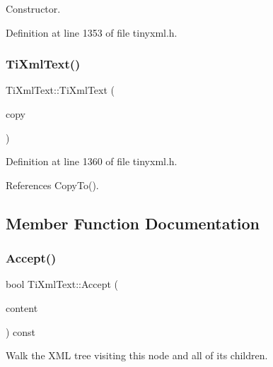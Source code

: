 Constructor. 



Definition at line 1353 of file tinyxml.\+h.

\hypertarget{class_ti_xml_text_a8d2cc1b4af2208cbb0171cf20f6815d1}{}\label{class_ti_xml_text_a8d2cc1b4af2208cbb0171cf20f6815d1} 
\subsubsection{\texorpdfstring{Ti\+Xml\+Text()}{TiXmlText()}\hspace{0.1cm}{\footnotesize\ttfamily [3/3]}}
{\footnotesize\ttfamily Ti\+Xml\+Text\+::\+Ti\+Xml\+Text (\begin{DoxyParamCaption}\item[{const \hyperlink{class_ti_xml_text}{Ti\+Xml\+Text} \&}]{copy }\end{DoxyParamCaption})\hspace{0.3cm}{\ttfamily [inline]}}



Definition at line 1360 of file tinyxml.\+h.



References Copy\+To().



\subsection{Member Function Documentation}
\hypertarget{class_ti_xml_text_af65964326eac4640bfb97d4622fa0de2}{}\label{class_ti_xml_text_af65964326eac4640bfb97d4622fa0de2} 
\subsubsection{\texorpdfstring{Accept()}{Accept()}}
{\footnotesize\ttfamily bool Ti\+Xml\+Text\+::\+Accept (\begin{DoxyParamCaption}\item[{\hyperlink{class_ti_xml_visitor}{Ti\+Xml\+Visitor} $\ast$}]{content }\end{DoxyParamCaption}) const\hspace{0.3cm}{\ttfamily [virtual]}}

Walk the X\+ML tree visiting this node and all of its children. 

